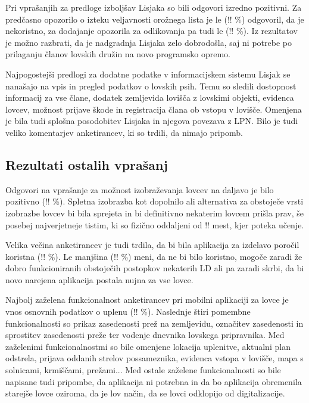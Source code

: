 \documentclass[a4paper,12pt,openright]{book}
\begin{document}
Pri vprašanjih za predloge izboljšav Lisjaka so bili odgovori izredno pozitivni. 
Za predčasno opozorilo o izteku veljavnosti orožnega lista je le (!! \%) odgovoril, da je nekoristno, za dodajanje opozorila za odlikovanja pa tudi le (!! \%).
Iz rezultatov je možno razbrati, da je nadgradnja Lisjaka zelo dobrodošla, saj ni potrebe po prilaganju članov lovskih družin na novo programsko opremo.

Najpogostejši predlogi za dodatne podatke v informacijskem sistemu Lisjak se nanašajo na vpis in pregled podatkov o lovskih psih.
Temu so sledili dostopnost informacij za vse člane, dodatek zemljevida lovišča z lovskimi objekti, evidenca lovcev, možnost prijave škode in registracija člana ob vstopu v lovišče.
Omenjena je bila tudi splošna posodobitev Lisjaka in njegova povezava z LPN.
Bilo je tudi veliko komentarjev anketirancev, ki so trdili, da nimajo pripomb.

\subsection{Rezultati ostalih vprašanj}

Odgovori na vprašanje za možnost izobraževanja lovcev na daljavo je bilo pozitivno (!! \%).
Spletna izobrazba kot dopolnilo ali alternativa za obstoječe vrsti izobrazbe lovcev bi bila sprejeta in bi definitivno nekaterim lovcem prišla prav, še posebej najverjetneje tistim, ki so fizično oddaljeni od !! mest, kjer poteka učenje.

Velika večina anketirancev je tudi trdila, da bi bila aplikacija za izdelavo poročil koristna (!! \%). 
Le manjšina (!! \%) meni, da ne bi bilo koristno, mogoče zaradi že dobro funkcioniranih obstoječih postopkov nekaterih LD ali pa zaradi skrbi, da bi novo narejena aplikacija postala nujna za vse lovce.

Najbolj zaželena funkcionalnost anketirancev pri mobilni aplikaciji za lovce je vnos osnovnih podatkov o uplenu (!! \%).
Naslednje štiri pomembne funkcionalnosti so prikaz zasedenosti prež na zemljevidu, označitev zasedenosti in sprostitev zasedenosti preže ter vodenje dnevnika lovskega pripravnika.
Med zaželenimi funkcionalnostmi so bile omenjene lokacija uplenitve, aktualni plan odstrela, prijava oddanih strelov possameznika, evidenca vstopa v lovišče, mapa s solnicami, krmiščami, prežami...
Med ostale zaželene funkcionalnosti so bile napisane tudi pripombe, da aplikacija ni potrebna in da bo aplikacija obremenila starejše lovce oziroma, da je lov način, da se lovci odklopijo od digitalizacije. 
\end{document}

